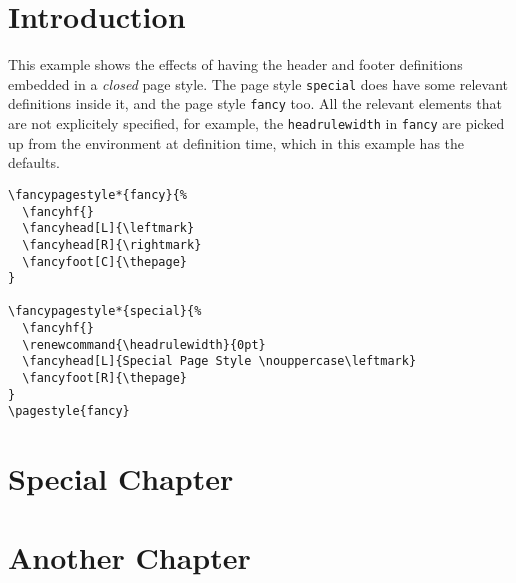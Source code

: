 \documentclass[oneside]{report}
\renewcommand{\headrulewidth}{0pt}
\begin{document}
\chapter{Introduction}

This example shows the effects of having the header and footer definitions embedded in a \emph{closed} page style. The page style \texttt{special} does have some relevant definitions inside it, and the page style \texttt{fancy} too. All the relevant elements that are not explicitely specified, for example, the \verb|headrulewidth| in \texttt{fancy} are picked up from the environment at definition time, which in this example has the defaults.

\begin{verbatim}
\fancypagestyle*{fancy}{%
  \fancyhf{}
  \fancyhead[L]{\leftmark}
  \fancyhead[R]{\rightmark}
  \fancyfoot[C]{\thepage}
}

\fancypagestyle*{special}{%
  \fancyhf{}
  \renewcommand{\headrulewidth}{0pt}
  \fancyhead[L]{Special Page Style \nouppercase\leftmark}
  \fancyfoot[R]{\thepage}
}
\pagestyle{fancy}
\end{verbatim}

\bigskip

\lipsum[1-5]

\chapter{Special Chapter}
\pagestyle{special}
\lipsum

\chapter{Another Chapter}
\pagestyle{fancy}
\lipsum
\end{document}
